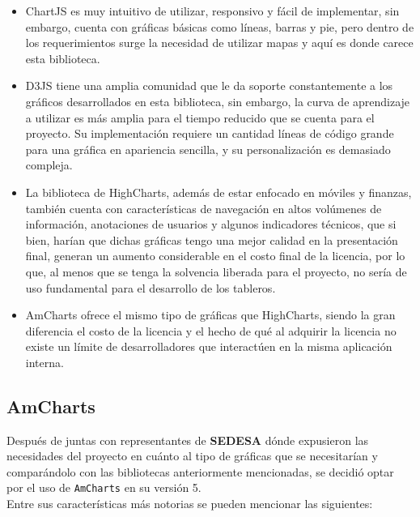 \begin{itemize}
    \item ChartJS es muy intuitivo de utilizar, responsivo y fácil de implementar, sin embargo, cuenta con gráficas básicas como líneas, barras y pie, pero dentro de los requerimientos surge la necesidad de utilizar mapas y aquí es donde carece esta biblioteca.

    \item D3JS tiene una amplia comunidad que le da soporte constantemente a los gráficos desarrollados en esta biblioteca, sin embargo, la curva de aprendizaje a utilizar es más amplia para el tiempo reducido que se cuenta para el proyecto. Su implementación requiere un cantidad líneas de código grande para una gráfica en apariencia sencilla, y su personalización es demasiado compleja.

    \item La biblioteca de HighCharts, además de estar enfocado en móviles y finanzas, también cuenta con características de navegación en altos volúmenes de información, anotaciones de usuarios y algunos indicadores técnicos, que si bien, harían que dichas gráficas tengo una mejor calidad en la presentación final, generan un aumento considerable en el costo final de la licencia, por lo que, al menos que se tenga la solvencia liberada para el proyecto, no sería de uso fundamental para el desarrollo de los tableros.

    \item AmCharts ofrece el mismo tipo de gráficas que HighCharts, siendo la gran diferencia el costo de la licencia y el hecho de qué al adquirir la licencia no existe un límite de desarrolladores que interactúen en la misma aplicación interna.
\end{itemize}








\subsection{AmCharts}

Después de juntas con representantes de \textbf{SEDESA} dónde expusieron las necesidades del proyecto en cuánto al tipo de gráficas que se necesitarían y comparándolo con las bibliotecas anteriormente mencionadas, se decidió optar por el uso de \texttt{AmCharts} en su versión 5.\\

Entre sus características más notorias se pueden mencionar las siguientes:

